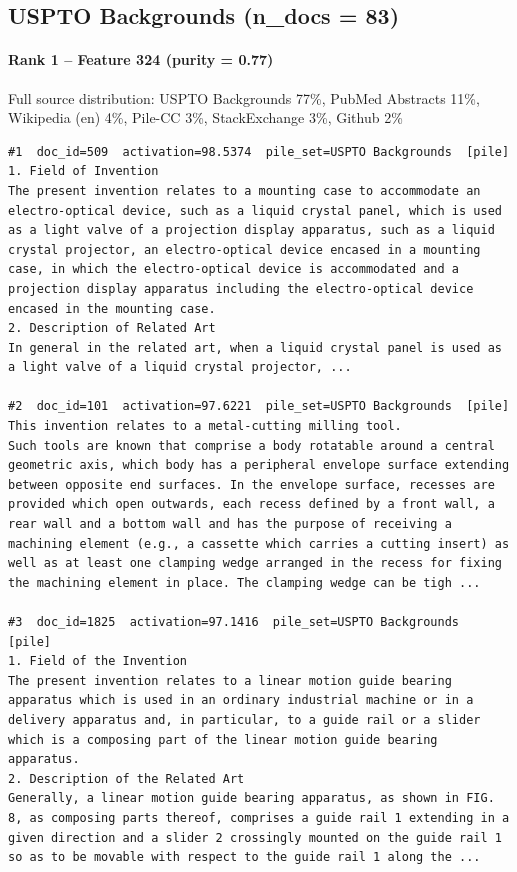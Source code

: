 \subsection*{USPTO Backgrounds (n\_docs = 83)}

\paragraph*{Rank 1 -- Feature 324 (purity = 0.77)}

Full source distribution: USPTO Backgrounds 77\%, PubMed Abstracts 11\%, Wikipedia (en) 4\%, Pile-CC 3\%, StackExchange 3\%, Github 2\%

\begin{verbatim}
#1  doc_id=509  activation=98.5374  pile_set=USPTO Backgrounds  [pile]
1. Field of Invention
The present invention relates to a mounting case to accommodate an electro-optical device, such as a liquid crystal panel, which is used as a light valve of a projection display apparatus, such as a liquid crystal projector, an electro-optical device encased in a mounting case, in which the electro-optical device is accommodated and a projection display apparatus including the electro-optical device encased in the mounting case.
2. Description of Related Art
In general in the related art, when a liquid crystal panel is used as a light valve of a liquid crystal projector, ...

#2  doc_id=101  activation=97.6221  pile_set=USPTO Backgrounds  [pile]
This invention relates to a metal-cutting milling tool.
Such tools are known that comprise a body rotatable around a central geometric axis, which body has a peripheral envelope surface extending between opposite end surfaces. In the envelope surface, recesses are provided which open outwards, each recess defined by a front wall, a rear wall and a bottom wall and has the purpose of receiving a machining element (e.g., a cassette which carries a cutting insert) as well as at least one clamping wedge arranged in the recess for fixing the machining element in place. The clamping wedge can be tigh ...

#3  doc_id=1825  activation=97.1416  pile_set=USPTO Backgrounds  [pile]
1. Field of the Invention
The present invention relates to a linear motion guide bearing apparatus which is used in an ordinary industrial machine or in a delivery apparatus and, in particular, to a guide rail or a slider which is a composing part of the linear motion guide bearing apparatus.
2. Description of the Related Art
Generally, a linear motion guide bearing apparatus, as shown in FIG. 8, as composing parts thereof, comprises a guide rail 1 extending in a given direction and a slider 2 crossingly mounted on the guide rail 1 so as to be movable with respect to the guide rail 1 along the ...


\end{verbatim}
